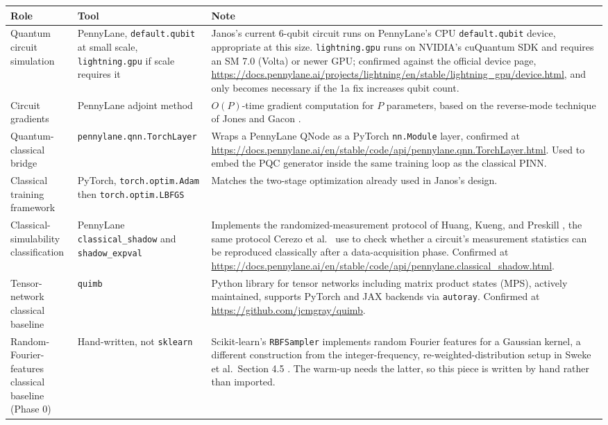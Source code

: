 \documentclass[10pt,a4paper]{article}
\begin{document}
\begin{center}
\small
\begin{tabular}{@{}p{}p{}p{}@{}}
\textbf{Role} & \textbf{Tool} & \textbf{Note} \\
\hline
Quantum circuit simulation & PennyLane, \texttt{default.qubit} at small scale, \texttt{lightning.gpu} if scale requires it & Janos's current 6-qubit circuit runs on PennyLane's CPU \texttt{default.qubit} device, appropriate at this size. \texttt{lightning.gpu} runs on NVIDIA's cuQuantum SDK and requires an SM 7.0 (Volta) or newer GPU; confirmed against the official device page, \url{https://docs.pennylane.ai/projects/lightning/en/stable/lightning_gpu/device.html}, and only becomes necessary if the 1a fix increases qubit count. \\
Circuit gradients & PennyLane adjoint method & $O(P)$-time gradient computation for $P$ parameters, based on the reverse-mode technique of Jones and Gacon \cite{jonesgacon2020}. \\
Quantum-classical bridge & \texttt{pennylane.qnn.TorchLayer} & Wraps a PennyLane QNode as a PyTorch \texttt{nn.Module} layer, confirmed at \url{https://docs.pennylane.ai/en/stable/code/api/pennylane.qnn.TorchLayer.html}. Used to embed the PQC generator inside the same training loop as the classical PINN. \\
Classical training framework & PyTorch, \texttt{torch.optim.Adam} then \texttt{torch.optim.LBFGS} & Matches the two-stage optimization already used in Janos's design. \\
Classical-simulability classification & PennyLane \texttt{classical\_shadow} and \texttt{shadow\_expval} & Implements the randomized-measurement protocol of Huang, Kueng, and Preskill \cite{huang2020}, the same protocol Cerezo et al.\ \cite{cerezo2025} use to check whether a circuit's measurement statistics can be reproduced classically after a data-acquisition phase. Confirmed at \url{https://docs.pennylane.ai/en/stable/code/api/pennylane.classical_shadow.html}. \\
Tensor-network classical baseline & \texttt{quimb} & Python library for tensor networks including matrix product states (MPS), actively maintained, supports PyTorch and JAX backends via \texttt{autoray}. Confirmed at \url{https://github.com/jcmgray/quimb}. \\
Random-Fourier-features classical baseline (Phase 0) & Hand-written, not \texttt{sklearn} & Scikit-learn's \texttt{RBFSampler} implements random Fourier features for a Gaussian kernel, a different construction from the integer-frequency, re-weighted-distribution setup in Sweke et al.\ Section 4.5 \cite{sweke2025}. The warm-up needs the latter, so this piece is written by hand rather than imported. \\

\end{tabular}
\end{center}
\end{document}

